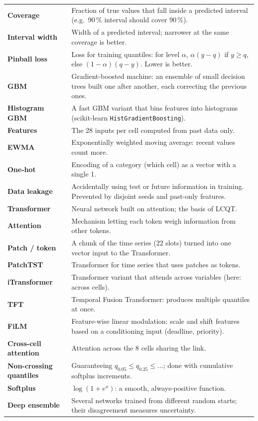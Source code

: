 \documentclass[11pt,a4paper]{article}
\begin{document}
\begin{longtable}{>{\raggedright\arraybackslash\bfseries}p{3.6cm}>{\raggedright\arraybackslash}p{12.2cm}}
Coverage & Fraction of true values that fall inside a predicted interval (e.g.\ 90\,\% interval should cover 90\,\%). \\
Interval width & Width of a predicted interval; narrower at the same coverage is better. \\
Pinball loss & Loss for training quantiles: for level $\alpha$, $\alpha(y-q)$ if $y \ge q$, else $(1-\alpha)(q-y)$. Lower is better. \\
GBM & Gradient-boosted machine: an ensemble of small decision trees built one after another, each correcting the previous ones. \\
Histogram GBM & A fast GBM variant that bins features into histograms (scikit-learn \texttt{HistGradientBoosting}). \\
Features & The 28 inputs per cell computed from past data only. \\
EWMA & Exponentially weighted moving average: recent values count more. \\
One-hot & Encoding of a category (which cell) as a vector with a single 1. \\
Data leakage & Accidentally using test or future information in training. Prevented by disjoint seeds and past-only features. \\
Transformer & Neural network built on attention; the basis of LCQT. \\
Attention & Mechanism letting each token weigh information from other tokens. \\
Patch / token & A chunk of the time series (22 slots) turned into one vector input to the Transformer. \\
PatchTST & Transformer for time series that uses patches as tokens. \\
iTransformer & Transformer variant that attends across variables (here: across cells). \\
TFT & Temporal Fusion Transformer: produces multiple quantiles at once. \\
FiLM & Feature-wise linear modulation: scale and shift features based on a conditioning input (deadline, priority). \\
Cross-cell attention & Attention across the 8 cells sharing the link. \\
Non-crossing quantiles & Guaranteeing $q_{0.05} \le q_{0.25} \le \dots$; done with cumulative softplus increments. \\
Softplus & $\log(1 + e^x)$: a smooth, always-positive function. \\
Deep ensemble & Several networks trained from different random starts; their disagreement measures uncertainty. \\

\end{longtable}
\end{document}
